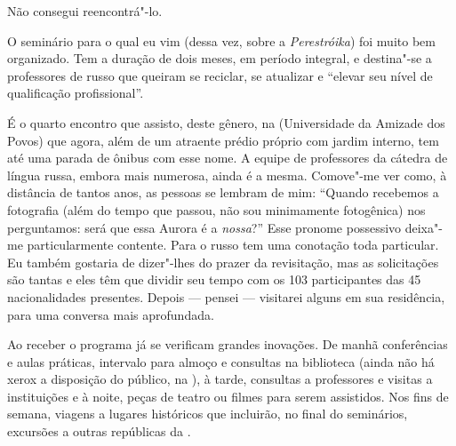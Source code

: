 Não consegui reencontrá"-lo.

O seminário para o qual eu vim (dessa vez, sobre a \emph{Perestróika})
foi muito bem organizado. Tem a duração de dois meses, em período
integral, e destina"-se a professores de russo que queiram se reciclar,
se atualizar e ``elevar seu nível de qualificação profissional''.

É o quarto encontro que assisto, deste gênero, na  (Universidade da
Amizade dos Povos) que agora, além de um atraente prédio próprio com
jardim interno, tem até uma parada de ônibus com esse nome. A equipe de
professores da cátedra de língua russa, embora mais numerosa, ainda é a
mesma. Comove"-me ver como, à distância de tantos anos, as pessoas se
lembram de mim: ``Quando recebemos a fotografia (além do tempo que
passou, não sou minimamente fotogênica) nos perguntamos: será que essa
Aurora é a \emph{nossa}?'' Esse pronome possessivo deixa"-me
particularmente contente. Para o russo tem uma conotação toda
particular. Eu também gostaria de dizer"-lhes do prazer da revisitação,
mas as solicitações são tantas e eles têm que dividir seu tempo com os
103 participantes das 45 nacionalidades presentes. Depois --- pensei ---
visitarei alguns em sua residência, para uma conversa mais aprofundada.

Ao receber o programa já se verificam grandes inovações. De manhã
conferências e aulas práticas, intervalo para almoço e consultas na
biblioteca (ainda não há xerox a disposição do público, na ), à
tarde, consultas a professores e visitas a instituições e à noite, peças
de teatro ou filmes para serem assistidos. Nos fins de semana, viagens a
lugares históricos que incluirão, no final do seminários, excursões a
outras repúblicas da .

